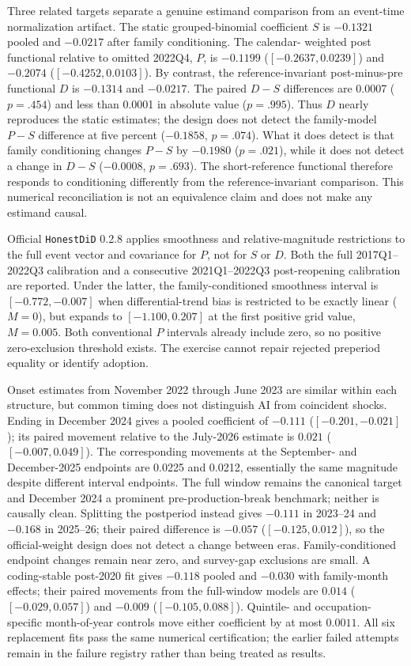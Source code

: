 Three related targets separate a genuine estimand comparison from an event-time
normalization artifact.  The static grouped-binomial coefficient $S$ is
$-0.1321$ pooled and $-0.0217$ after family conditioning.  The calendar-
weighted post functional relative to omitted 2022Q4, $P$, is $-0.1199$
($[-0.2637,0.0239]$) and $-0.2074$ ($[-0.4252,0.0103]$).  By contrast, the
reference-invariant post-minus-pre functional $D$ is $-0.1314$ and $-0.0217$.
The paired $D-S$ differences are 0.0007 ($p=.454$) and less than 0.0001 in
absolute value ($p=.995$).  Thus $D$ nearly reproduces the static estimates;
the design does not detect the family-model $P-S$ difference at five percent
($-0.1858$, $p=.074$).  What it does detect is that family conditioning changes
$P-S$ by $-0.1980$ ($p=.021$), while it does not detect a change in $D-S$
($-0.0008$, $p=.693$).  The short-reference functional therefore responds to
conditioning differently from the reference-invariant comparison.  This
numerical reconciliation is not an equivalence claim and does not make any
estimand causal.

Official \texttt{HonestDiD} 0.2.8 applies smoothness and relative-magnitude restrictions to the full event vector and covariance for $P$, not for $S$ or $D$.  Both the full 2017Q1--2022Q3 calibration and a consecutive 2021Q1--2022Q3 post-reopening calibration are reported.  Under the latter, the family-conditioned smoothness interval is $[-0.772,-0.007]$ when differential-trend bias is restricted to be exactly linear ($M=0$), but expands to $[-1.100,0.207]$ at the first positive grid value, $M=0.005$.  Both conventional $P$ intervals already include zero, so no positive zero-exclusion threshold exists.  The exercise cannot repair rejected preperiod equality or identify adoption.

Onset estimates from November 2022 through June 2023 are similar within each structure, but common timing does not distinguish AI from coincident shocks.  Ending in December 2024 gives a pooled coefficient of $-0.111$ ($[-0.201,-0.021]$); its paired movement relative to the July-2026 estimate is $0.021$ ($[-0.007,0.049]$).  The corresponding movements at the September- and December-2025 endpoints are 0.0225 and 0.0212, essentially the same magnitude despite different interval endpoints.  The full window remains the canonical target and December 2024 a prominent pre-production-break benchmark; neither is causally clean.  Splitting the postperiod instead gives $-0.111$ in 2023--24 and $-0.168$ in 2025--26; their paired difference is $-0.057$ ($[-0.125,0.012]$), so the official-weight design does not detect a change between eras.  Family-conditioned endpoint changes remain near zero, and survey-gap exclusions are small.  A coding-stable post-2020 fit gives $-0.118$ pooled and $-0.030$ with family-month effects; their paired movements from the full-window models are $0.014$ ($[-0.029,0.057]$) and $-0.009$ ($[-0.105,0.088]$).  Quintile- and occupation-specific month-of-year controls move either coefficient by at most $0.0011$.  All six replacement fits pass the same numerical certification; the earlier failed attempts remain in the failure registry rather than being treated as results.

